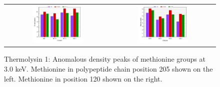 \begin{figure}
    \centering
    \begin{tabular}{cc}
        \includegraphics[width = 0.5\textwidth]{plots/exp1/tlys_9_P6122/peaks/3p0_met250.pdf} & \includegraphics[width = 0.5\textwidth]{plots/exp1/tlys_9_P6122/peaks/3p0_met120.pdf}
    \end{tabular}
    \caption{Thermolysin 1: Anomalous density peaks of methionine groups at 3.0 \unit{keV}. Methionine in polypeptide chain position 205 shown on the left. Methionine in position 120 shown on the right.}
    \label{fig:tlys9_met_peaks_3p0}
\end{figure}

